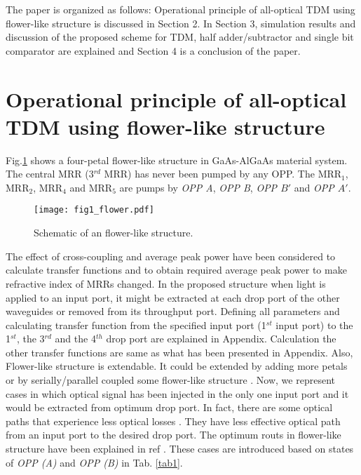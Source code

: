 \documentclass{osa-article}
\begin{document}
The paper is organized as follows: Operational principle of all-optical TDM using flower-like structure is discussed in Section 2. In Section 3, simulation results and discussion of the proposed scheme for TDM, half adder/subtractor and single bit comparator are explained and Section 4 is a conclusion of the paper.

\section{ Operational principle of all-optical TDM using flower-like structure}
\label{} 
Fig.\ref{fig1_flower} shows a four-petal flower-like structure in GaAs-AlGaAs material system. The central MRR (3$^{rd}$ MRR) has never been pumped by any OPP. The MRR$_1$, MRR$_2$, MRR$_4$ and MRR$_5$ are pumps by \textit{OPP A}, \textit{OPP B}, \textit{OPP $B'$} and \textit{OPP $A'$}.
\begin{figure}[tb]
\centering
	\texttt{[image: fig1\_flower.pdf]}
	\caption{Schematic of an flower-like structure.}
	\label{fig1_flower}
\end{figure}
 The effect of cross-coupling and average peak power have been considered to calculate transfer functions and to obtain required average peak power to make refractive index of MRRs changed. In the proposed structure when light is applied to an input port, it might be extracted at each drop port of the other waveguides or removed from its throughput port. Defining all parameters and calculating transfer function from the specified input port (1$^{st}$ input port) to the 1$^{st}$, the 3$^{rd}$ and the 4$^{th}$ drop port are explained in Appendix. Calculation the other transfer functions are same as what has been presented in Appendix. Also, Flower-like structure is extendable. It could be extended by adding more petals or by serially/parallel coupled some flower-like structure \cite{razaghi2016design}. Now, we represent cases in which optical signal has been injected in the only one input port and it would be extracted from optimum drop port. In fact, there are some optical paths that experience less optical losses \cite{razaghi2016design}. They have less effective optical path from an input port to the desired drop port. The optimum routs in flower-like structure have been explained in ref \cite{razaghi2016design}. These cases are introduced based on states of \textit{OPP (A)} and \textit{OPP (B)} in Tab. \ref{tab1}.
\end{document}
